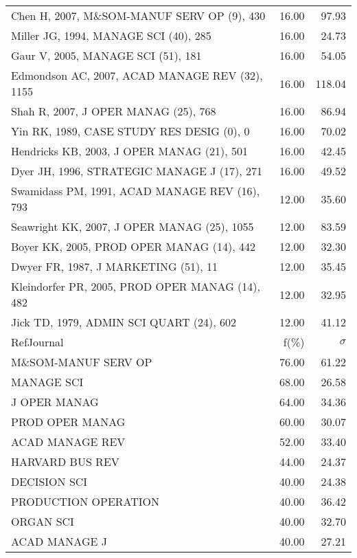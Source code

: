 \documentclass[a4paper,11pt]{report}
\begin{document}
\begin{landscape}
\begin{table}[!ht]
{\begin{tabular}{|l r r|}
Chen H, 2007, M\&SOM-MANUF SERV OP (9), 430 & 16.00 & 97.93\\
Miller JG, 1994, MANAGE SCI (40), 285 & 16.00 & 24.73\\
Gaur V, 2005, MANAGE SCI (51), 181 & 16.00 & 54.05\\
Edmondson AC, 2007, ACAD MANAGE REV (32), 1155 & 16.00 & 118.04\\
Shah R, 2007, J OPER MANAG (25), 768 & 16.00 & 86.94\\
Yin RK, 1989, CASE STUDY RES DESIG (0), 0 & 16.00 & 70.02\\
Hendricks KB, 2003, J OPER MANAG (21), 501 & 16.00 & 42.45\\
Dyer JH, 1996, STRATEGIC MANAGE J (17), 271 & 16.00 & 49.52\\
Swamidass PM, 1991, ACAD MANAGE REV (16), 793 & 12.00 & 35.60\\
Seawright KK, 2007, J OPER MANAG (25), 1055 & 12.00 & 83.59\\
Boyer KK, 2005, PROD OPER MANAG (14), 442 & 12.00 & 32.30\\
Dwyer FR, 1987, J MARKETING (51), 11 & 12.00 & 35.45\\
Kleindorfer PR, 2005, PROD OPER MANAG (14), 482 & 12.00 & 32.95\\
Jick TD, 1979, ADMIN SCI QUART (24), 602 & 12.00 & 41.12\\
\hline
\hline
RefJournal & f(\%) & $\sigma$\\
\hline
M\&SOM-MANUF SERV OP & 76.00 & 61.22\\
MANAGE SCI & 68.00 & 26.58\\
J OPER MANAG & 64.00 & 34.36\\
PROD OPER MANAG & 60.00 & 30.07\\
ACAD MANAGE REV & 52.00 & 33.40\\
HARVARD BUS REV & 44.00 & 24.37\\
DECISION SCI & 40.00 & 24.38\\
PRODUCTION OPERATION & 40.00 & 36.42\\
ORGAN SCI & 40.00 & 32.70\\
ACAD MANAGE J & 40.00 & 27.21\\
\hline
\end{tabular}
}
\end{table}

\clearpage


\end{landscape}
\end{document}
